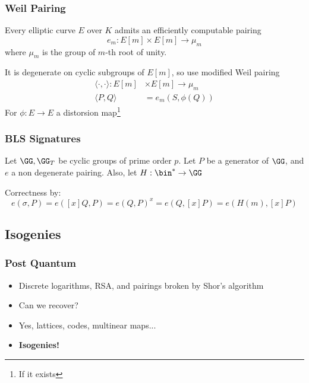 \documentclass{beamer}
\begin{document}
\begin{frame}
    \frametitle{Weil Pairing}
    Every elliptic curve $E$ over $K$ admits an efficiently computable pairing
    \[ e_m : E[m] \times E[m] \to \mu_m \]
    where $\mu_m$ is the group of $m$-th root of unity. 

    \pause
    It is degenerate on cyclic subgroups of $E[m]$, so use modified Weil pairing
    \begin{align*}
        \langle \cdot , \cdot \rangle : E[m] &\times E[m] \to \mu_m \\
        \langle P, Q \rangle &= e_m(S, \phi(Q))
    \end{align*}
    For $\phi: E \to E$ a distorsion map\footnote{If it exists}

\end{frame}

\begin{frame}
    \frametitle{BLS Signatures}
    Let $\GG, \GG_T$ be cyclic groups of prime order $p$. Let $P$ be a generator of $\GG$, and $e$ a non degenerate pairing.
    Also, let $H: \bin^* \to \GG$
    \begin{center}
    \pause
    \begin{pcvstack}
        \begin{pchstack}
        \pause
        \end{pchstack}

        \pause
    \end{pcvstack}
    \end{center}
    \pause
    Correctness by:
    \[ e(\sigma, P) = e([x]Q, P) = e(Q, P)^x = e(Q, [x]P) = e(H(m), [x]P) \]
 
\end{frame}

\subsection{Isogenies}
\begin{frame}
    \frametitle{Post Quantum}
    \begin{itemize}
        \item<1-> Discrete logarithms, RSA, and pairings broken by Shor's algorithm
        \item<2-> Can we recover?
        \item<3-> Yes, lattices, codes, multinear maps...
        \item<4-> \textbf{Isogenies!}
    \end{itemize}
\end{frame}
\end{document}
